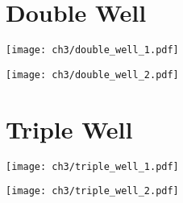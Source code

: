 \section{Double Well}
\begin{center}
        \texttt{[image: ch3/double\_well\_1.pdf]}   
\end{center}
\begin{center}
        \texttt{[image: ch3/double\_well\_2.pdf]}   
\end{center}

\section{Triple Well}
\begin{center}
        \texttt{[image: ch3/triple\_well\_1.pdf]}   
\end{center}
\begin{center}
        \texttt{[image: ch3/triple\_well\_2.pdf]}   
\end{center}
